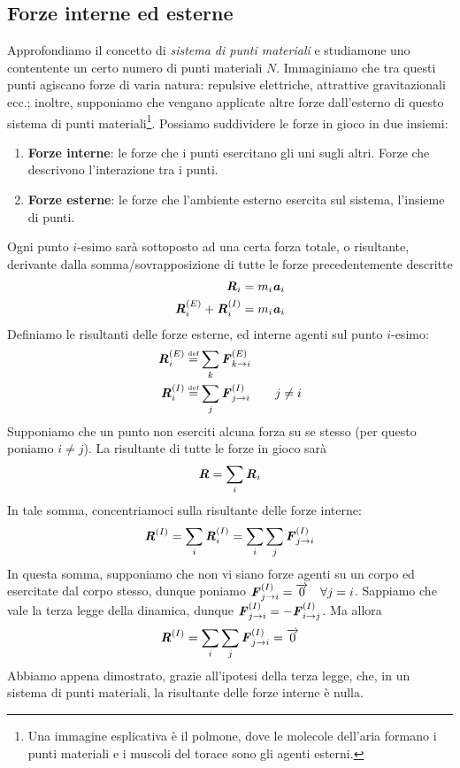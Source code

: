 \subsection{Forze interne ed esterne}
Approfondiamo il concetto di \textit{sistema di punti materiali} e studiamone
uno contentente un certo numero di punti materiali $N$. Immaginiamo che
tra questi punti agiscano forze di varia natura: repulsive elettriche,
attrattive gravitazionali ecc.; inoltre, supponiamo che vengano applicate
altre forze dall'esterno di questo sistema di punti materiali\footnote{Una
immagine esplicativa è il polmone, dove le molecole dell'aria formano i
punti materiali e i muscoli del torace sono gli agenti esterni.}.
Possiamo suddividere le forze in gioco in due insiemi:
\begin{enumerate}
    \item \textbf{Forze interne}: le forze che i punti esercitano gli uni
    sugli altri. Forze che descrivono l'interazione tra i punti.
    \item \textbf{Forze esterne}: le forze che l'ambiente esterno esercita
    sul sistema, l'insieme di punti.
\end{enumerate}
Ogni punto $i$-esimo sarà sottoposto ad una certa forza totale, o risultante, derivante
dalla somma/sovrapposizione di tutte le forze precedentemente descritte
\begin{align*}
    \textbf{\textit{R}}_i = m_i\textbf{\textit{a}}_i\\
    \textbf{\textit{R}}^{(E)}_i + \textbf{\textit{R}}^{(I)}_i = m_i\textbf{\textit{a}}_i
\end{align*}
Definiamo le risultanti delle forze esterne, ed interne agenti sul punto
$i$-esimo:
\begin{align*}
    \vecsymb{R}^{(E)}_i &\eqdef \sum_{k} \vecsymb{F}^{(E)}_{k \to i}\\
    \vecsymb{R}^{(I)}_i &\eqdef \sum_{j} \vecsymb{F}^{(I)}_{j \to i} \qquad j \not = i
\end{align*}
Supponiamo che un punto non eserciti alcuna forza su se stesso (per questo
poniamo $i \not = j$).
La risultante di tutte le forze in gioco sarà
\[ \textbf{\textit{R}} = \sum_{i} \textbf{\textit{R}}_i \]
In tale somma, concentriamoci sulla risultante delle forze interne:
\[ \textbf{\textit{R}}^{(I)} = \sum_{i} \textbf{\textit{R}}^{(I)}_i = \sum_{i} \sum_{j} \textbf{\textit{F}}^{(I)}_{j \to i} \]
In questa somma, supponiamo che non vi siano forze agenti su un corpo
ed esercitate dal corpo stesso, dunque poniamo $\textbf{\textit{F}}^{(I)}_{j \to i} = \overrightarrow{0} \quad \forall j = i$.
Sappiamo che vale la terza legge della dinamica, dunque
$\textbf{\textit{F}}^{(I)}_{j \to i} = -\textbf{\textit{F}}^{(I)}_{i \to j}$. Ma allora
\begin{align}
    \textbf{\textit{R}}^{(I)} = \sum_{i} \sum_{j} \textbf{\textit{F}}^{(I)}_{j \to i} = \overrightarrow{0}\label{interne}
\end{align}
Abbiamo appena dimostrato, grazie all'ipotesi della terza legge,
che, in un sistema di punti materiali, la risultante delle forze interne
è nulla.

